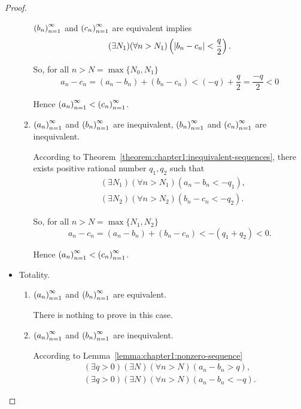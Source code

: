 \begin{proof}
\begin{itemize}
\begin{enumerate}[label={\textbf{Case \arabic*.}},itemindent=0.5cm]
                        ${\left({b_{n}}\right)}^{\infty}_{n=1}$ and ${\left({c_{n}}\right)}^{\infty}_{n=1}$ are equivalent implies
                        \[
                            (\exists N_{1})(\forall n > N_{1})\left(\left\vert{b_{n} - c_{n}}\right\vert < \frac{q}{2}\right).
                        \]

                        So, for all $n > N = \max\{ N_{0}, N_{1} \}$
                        \[
                            a_{n} - c_{n} = (a_{n} - b_{n}) + (b_{n} - c_{n}) < (-q) + \frac{q}{2} = \frac{-q}{2} < 0
                        \]

                        Hence ${\left({a_{n}}\right)}^{\infty}_{n=1} < {\left({c_{n}}\right)}^{\infty}_{n=1}$.
                  \item ${\left({a_{n}}\right)}^{\infty}_{n=1}$ and ${\left({b_{n}}\right)}^{\infty}_{n=1}$ are inequivalent, ${\left({b_{n}}\right)}^{\infty}_{n=1}$ and ${\left({c_{n}}\right)}^{\infty}_{n=1}$ are inequivalent.

                        According to Theorem~\ref{theorem:chapter1:inequivalent-sequences}, there exists positive rational number $q_{1}, q_{2}$ such that
                        \[
                            \begin{split}
                                & (\exists N_{1})(\forall n > N_{1})(a_{n} - b_{n} < -q_{1}), \\
                                & (\exists N_{2})(\forall n > N_{2})(b_{n} - c_{n} < -q_{2}).
                            \end{split}
                        \]

                        So, for all $n > N = \max\{ N_{1}, N_{2} \}$
                        \[
                            a_{n} - c_{n} = (a_{n} - b_{n}) + (b_{n} - c_{n}) < -(q_{1} + q_{2}) < 0.
                        \]

                        Hence ${\left({a_{n}}\right)}^{\infty}_{n=1} < {\left({c_{n}}\right)}^{\infty}_{n=1}$.
              \end{enumerate}
        \item Totality.
              \begin{enumerate}[label={\textbf{Case \arabic*.}},itemsep=0pt,itemindent=1cm]
                  \item ${\left({a_{n}}\right)}^{\infty}_{n=1}$ and ${\left({b_{n}}\right)}^{\infty}_{n=1}$ are equivalent.

                        There is nothing to prove in this case.

                  \item ${\left({a_{n}}\right)}^{\infty}_{n=1}$ and ${\left({b_{n}}\right)}^{\infty}_{n=1}$ are inequivalent.

                        According to Lemma~\ref{lemma:chapter1:nonzero-sequence}
                        \begin{align*}
                            (\exists q > 0)(\exists N)(\forall n > N)(a_{n} - b_{n} > q), \\
                            (\exists q > 0)(\exists N)(\forall n > N)(a_{n} - b_{n} < -q).
                        \end{align*}


\end{enumerate}
\end{itemize}
\end{proof}
